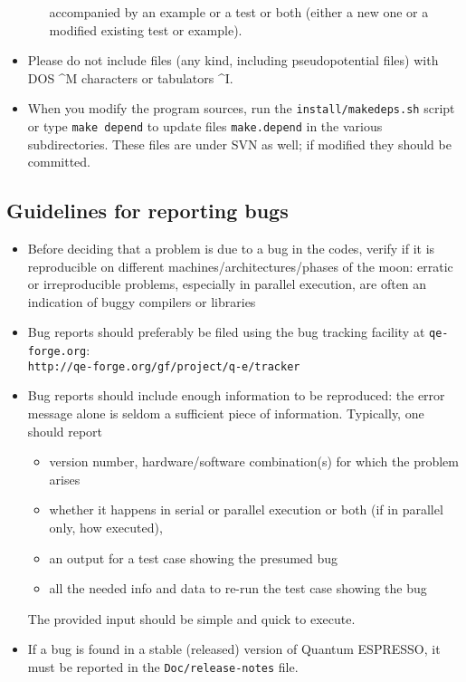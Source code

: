 \documentclass[12pt,a4paper]{article}
\def\qe{{\sc Quantum ESPRESSO}}
\def\qeforge{\texttt{qe-forge.org}}
\begin{document}
\begin{itemize}
\begin{itemize}
accompanied by an example or a test or both (either a 
new one or a modified existing test or example).
\end{itemize}
\item Please do not include files (any kind, including
pseudopotential files) with DOS \^{}M characters or 
tabulators \^{}I. 
\item When you modify the program sources, run the
\texttt{install/makedeps.sh}  script  or type \texttt{make depend} 
to update files \texttt{make.depend} in the various 
subdirectories. These files are under SVN as well;
if modified they should be committed.
\end{itemize}

\subsection{Guidelines for reporting bugs}

\label{SubSec:Bugs}
\begin{itemize}
\item Before deciding that a problem is due to a bug in the codes, 
verify if it is reproducible on different machines/architectures/phases
of the moon: erratic or irreproducible problems, especially in parallel
execution, are often an indication of buggy compilers or libraries
\item Bug reports should preferably be filed using the bug tracking 
facility at \qeforge:\\
\texttt{http://qe-forge.org/gf/project/q-e/tracker}
\item Bug reports should include enough information to be reproduced: 
the error message alone is seldom a sufficient piece of information. 
Typically, one should report
\begin{itemize}
\item version number, hardware/software combination(s) for which 
     the problem arises
\item whether it happens in serial or parallel execution or both 
(if in parallel only, how executed), 
\item an output for a test case showing the presumed bug
\item all the needed info and data to re-run the test case showing
the bug
\end{itemize}
The provided input should be simple and quick to execute.
\item If a bug is found in a stable (released) version of \qe, it must
be reported in the \texttt{Doc/release-notes} file.
\end{itemize}
\end{document}
